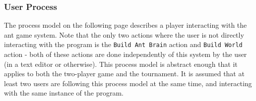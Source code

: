 \documentclass[11pt]{article}
\begin{document}
\subsubsection{User Process}\label{user-process}

The process model on the following page describes a player interacting with the ant game
system. Note that the only two actions where the user is not directly
interacting with the program is the \texttt{Build\ Ant\ Brain} action
and \texttt{Build\ World} action - both of these actions are done
independently of this system by the user (in a text editor or
otherwise). This process model is abstract enough that it applies to
both the two-player game and the tournament. It is assumed that at least
two users are following this process model at the same time, and
interacting with the same instance of the program.
\end{document}
